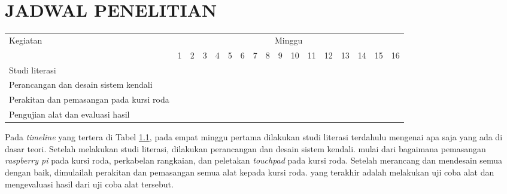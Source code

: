     \chapter{JADWAL PENELITIAN}

\newcommand{\w}{}
\newcommand{\G}{\cellcolor{gray}}
\newcommand{\B}{\cellcolor{blue}}
\begin{table}[H]
  \label{tbl:timeline}
  \begin{tabular}{|p{3.5cm}|c|c|c|c|c|c|c|c|c|c|c|c|c|c|c|c|}

    \hline
    \multirow{2}{*}{Kegiatan} & \multicolumn{16}{|c|}{Minggu}                                                                       \\
    \cline{2-17}              &
    1                         & 2                             & 3  & 4  & 5  & 6  & 7  & 8  & 9  & 10 & 11 & 12 & 13 & 14 & 15 & 16 \\
    \hline

    Studi literasi          &
    \G                        & \G                            & \G & \G & \w & \w & \w & \w & \w & \w & \w & \w & \w & \w & \w & \w \\
    \hline

    Perancangan dan desain sistem kendali           &
    \w                        & \w                            & \w & \w & \G & \G & \G & \G & \w & \w & \w & \w & \w & \w & \w & \w \\
    \hline

    Perakitan dan pemasangan pada kursi roda              &
    \w                        & \w                            & \w & \w & \w & \w & \w & \w & \G & \G & \G & \G & \w & \w & \w & \w \\
    \hline

    Pengujian alat dan evaluasi hasil       &
    \w                        & \w                            & \w & \w & \w & \w & \w & \w & \w & \w & \w & \w & \G & \G & \G & \G \\
    \hline
  \end{tabular}
\end{table}

Pada \emph{timeline} yang tertera di Tabel \ref{tbl:timeline}, pada empat minggu pertama dilakukan studi literasi terdahulu mengenai apa saja yang ada di dasar teori. Setelah melakukan studi literasi, dilakukan perancangan dan desain sistem kendali. mulai dari bagaimana pemasangan \textit{raspberry pi} pada kursi roda, perkabelan rangkaian, dan peletakan \textit{touchpad} pada kursi roda. Setelah merancang dan mendesain semua dengan baik, dimulailah perakitan dan pemasangan semua alat kepada kursi roda. yang terakhir adalah melakukan uji coba alat dan mengevaluasi hasil dari uji coba alat tersebut. 

